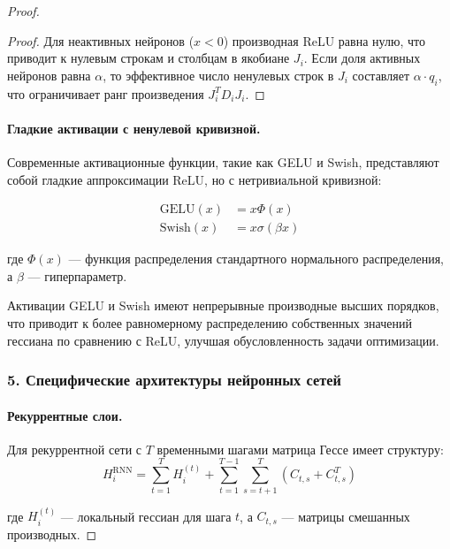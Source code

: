 \documentclass[a4paper,12pt]{article}
\begin{document}
\begin{proof}
    \begin{proof}
    Для неактивных нейронов ($x < 0$) производная ReLU равна нулю, что приводит к нулевым строкам и столбцам в якобиане $J_i$. Если доля активных нейронов равна $\alpha$, то эффективное число ненулевых строк в $J_i$ составляет $\alpha \cdot q_i$, что ограничивает ранг произведения $J_i^T D_i J_i$.
    \end{proof}
    
    \paragraph{Гладкие активации с ненулевой кривизной.}
    Современные активационные функции, такие как GELU и Swish, представляют собой гладкие аппроксимации ReLU, но с нетривиальной кривизной:
    
    \begin{align}
    \text{GELU}(x) &= x\Phi(x) \\
    \text{Swish}(x) &= x\sigma(\beta x)
    \end{align}
    
    где $\Phi(x)$ — функция распределения стандартного нормального распределения, а $\beta$ — гиперпараметр.
    
    \begin{proposition}
    Активации GELU и Swish имеют непрерывные производные высших порядков, что приводит к более равномерному распределению собственных значений гессиана по сравнению с ReLU, улучшая обусловленность задачи оптимизации.
    \end{proposition}
    
    \subsubsection*{5. Специфические архитектуры нейронных сетей}
    
    \paragraph{Рекуррентные слои.}
    Для рекуррентной сети с $T$ временными шагами матрица Гессе имеет структуру:
    \begin{equation}
    H_i^{\text{RNN}} = \sum_{t=1}^T H_i^{(t)} + \sum_{t=1}^{T-1} \sum_{s=t+1}^T (C_{t,s} + C_{t,s}^T)
    \end{equation}
    
    где $H_i^{(t)}$ — локальный гессиан для шага $t$, а $C_{t,s}$ — матрицы смешанных производных.
    

\end{proof}
\end{document}
